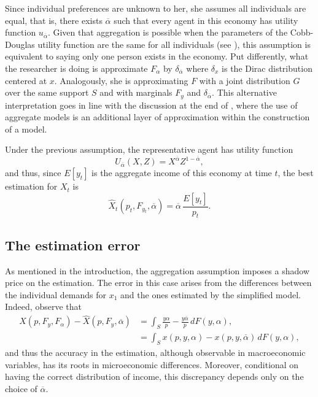 \documentclass[english, a4paper, 12pt]{article}
\begin{document}
Since individual preferences are unknown to her, she assumes all individuals are equal, that is, there exists $\overline{\alpha}$ such that every agent in this economy has utility function $u_{\overline{\alpha}}$. Given that aggregation is possible when the parameters of the Cobb-Douglas utility function are the same for all individuals (see ), this assumption is equivalent to saying only one person exists in the economy. Put differently, what the researcher is doing is approximate $F_{\alpha}$ by $\delta_{\overline{\alpha}}$ where $\delta_{x}$ is the Dirac distribution centered at $x$. Analogously, she is approximating $F$ with a joint distribution $G$ over the same support $S$ and with marginals $F_{y}$ and $\delta_{\overline{\alpha}}$. This alternative interpretation goes in line with the discussion at the end of , where the use of aggregate models is an additional layer of approximation within the construction of a model.

Under the previous assumption, the representative agent has utility function
	$$U_{\overline{\alpha}}(X, Z) = X^{\overline{\alpha}}Z^{1-\overline{\alpha}},$$
and thus, since $E[y_{t}]$ is the aggregate income of this economy at time $t$, the best estimation for $X_{t}$ is
	$$\widehat{X}_{t}(p_{t}, F_{y_{t}}, \overline{\alpha}) = \overline{\alpha}\, \frac{E[y_{t}]}{p_{t}}.$$

\subsection{The estimation error} \label{ssec:RepAgError}
As mentioned in the introduction, the aggregation assumption imposes a shadow price on the estimation. The error in this case arises from the differences between the individual demands for $x_{1}$ and the ones estimated by the simplified model. Indeed, observe that
	\begin{align*}
		X(p, F_{y}, F_{\alpha}) - \widehat{X}(p, F_{y}, \overline{\alpha})
			&=	\int_{S} \frac{y \alpha}{p} - \frac{y\overline{\alpha}}{p} \, dF(y,\alpha),	\\
			&=	\int_{S} x(p, y, \alpha) - x(p, y, \overline{\alpha}) \, dF(y,\alpha),
	\end{align*}
and thus the accuracy in the estimation, although observable in macroeconomic variables, has its roots in microeconomic differences. Moreover, conditional on having the correct distribution of income, this discrepancy depends only on the choice of $\overline{\alpha}$. 
\end{document}
